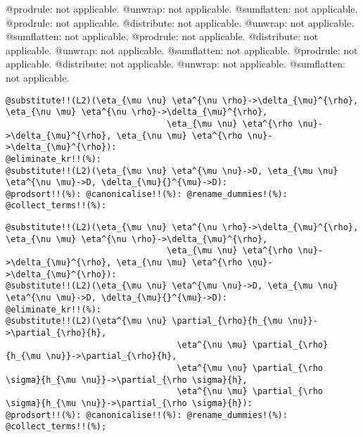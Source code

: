 \documentclass[11pt]{article}
\begin{document}
@prodrule: not applicable.
@unwrap: not applicable.
@sumflatten: not applicable.
@prodrule: not applicable.
@distribute: not applicable.
@unwrap: not applicable.
@sumflatten: not applicable.
@prodrule: not applicable.
@distribute: not applicable.
@unwrap: not applicable.
@sumflatten: not applicable.
@prodrule: not applicable.
@distribute: not applicable.
@unwrap: not applicable.
@sumflatten: not applicable.
{\color[named]{Blue}\begin{verbatim}
@substitute!!(L2)(\eta_{\mu \nu} \eta^{\nu \rho}->\delta_{\mu}^{\rho}, \eta_{\nu \mu} \eta^{\nu \rho}->\delta_{\mu}^{\rho},
                                \eta_{\mu \nu} \eta^{\rho \nu}->\delta_{\mu}^{\rho}, \eta_{\nu \mu} \eta^{\rho \nu}->\delta_{\mu}^{\rho}):
@eliminate_kr!!(%):
@substitute!!(L2)(\eta_{\mu \nu} \eta^{\mu \nu}->D, \eta_{\mu \nu} \eta^{\nu \mu}->D, \delta_{\mu}{}^{\mu}->D):
@prodsort!!(%): @canonicalise!!(%): @rename_dummies!(%): @collect_terms!!(%):
\end{verbatim}}
{\color[named]{Blue}\begin{verbatim}
@substitute!!(L2)(\eta_{\mu \nu} \eta^{\nu \rho}->\delta_{\mu}^{\rho}, \eta_{\nu \mu} \eta^{\nu \rho}->\delta_{\mu}^{\rho},
                                \eta_{\mu \nu} \eta^{\rho \nu}->\delta_{\mu}^{\rho}, \eta_{\nu \mu} \eta^{\rho \ņu}->\delta_{\mu}^{\rho}):
@substitute!!(L2)(\eta_{\mu \nu} \eta^{\mu \nu}->D, \eta_{\mu \nu} \eta^{\nu \mu}->D, \delta_{\mu}{}^{\mu}->D):
@eliminate_kr!!(%):
@substitute!!(L2)(\eta^{\mu \nu} \partial_{\rho}{h_{\mu \nu}}->\partial_{\rho}{h},
                                  \eta^{\nu \mu} \partial_{\rho}{h_{\mu \nu}}->\partial_{\rho}{h},
                                  \eta^{\mu \nu} \partial_{\rho \sigma}{h_{\mu \nu}}->\partial_{\rho \sigma}{h},
                                  \eta^{\nu \mu} \partial_{\rho \sigma}{h_{\mu \nu}}->\partial_{\rho \sigma}{h}):
@prodsort!!(%): @canonicalise!!(%): @rename_dummies!(%): @collect_terms!!(%);
\end{verbatim}}
\end{document}
